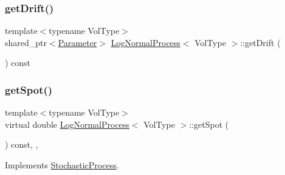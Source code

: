 \subsubsection{\texorpdfstring{get\+Drift()}{getDrift()}\hspace{0.1cm}{\footnotesize\ttfamily [2/2]}}
{\footnotesize\ttfamily template$<$typename Vol\+Type$>$ \\
shared\+\_\+ptr$<$\hyperlink{class_parameter}{Parameter}$>$ \hyperlink{class_log_normal_process}{Log\+Normal\+Process}$<$ Vol\+Type $>$\+::get\+Drift (\begin{DoxyParamCaption}{ }\end{DoxyParamCaption}) const\hspace{0.3cm}{\ttfamily [inline]}}

\hypertarget{class_log_normal_process_a2c01b829c59e9b6156f0e34b3632c800}{}\label{class_log_normal_process_a2c01b829c59e9b6156f0e34b3632c800} 
\subsubsection{\texorpdfstring{get\+Spot()}{getSpot()}}
{\footnotesize\ttfamily template$<$typename Vol\+Type$>$ \\
virtual double \hyperlink{class_log_normal_process}{Log\+Normal\+Process}$<$ Vol\+Type $>$\+::get\+Spot (\begin{DoxyParamCaption}{ }\end{DoxyParamCaption}) const\hspace{0.3cm}{\ttfamily [inline]}, {\ttfamily [override]}, {\ttfamily [virtual]}}



Implements \hyperlink{class_stochastic_process_aad2ef51ca4bc2fe5f33a73e8f0ee361e}{Stochastic\+Process}.

\hypertarget{class_log_normal_process_af2d153f75cd5efbeaa3a9028585dd835}{}\label{class_log_normal_process_af2d153f75cd5efbeaa3a9028585dd835} 
